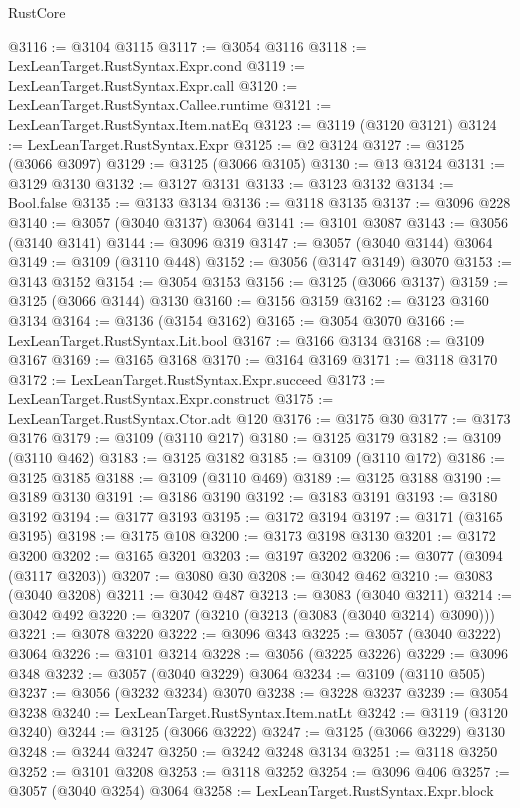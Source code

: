 \begin{lexlean}{RustCore}
\begin{coremodule}
@3116 := @3104 @3115
@3117 := @3054 @3116
@3118 := LexLeanTarget.RustSyntax.Expr.cond
@3119 := LexLeanTarget.RustSyntax.Expr.call
@3120 := LexLeanTarget.RustSyntax.Callee.runtime
@3121 := LexLeanTarget.RustSyntax.Item.natEq
@3123 := @3119 (@3120 @3121)
@3124 := LexLeanTarget.RustSyntax.Expr
@3125 := @2 @3124
@3127 := @3125 (@3066 @3097)
@3129 := @3125 (@3066 @3105)
@3130 := @13 @3124
@3131 := @3129 @3130
@3132 := @3127 @3131
@3133 := @3123 @3132
@3134 := Bool.false
@3135 := @3133 @3134
@3136 := @3118 @3135
@3137 := @3096 @228
@3140 := @3057 (@3040 @3137) @3064
@3141 := @3101 @3087
@3143 := @3056 (@3140 @3141)
@3144 := @3096 @319
@3147 := @3057 (@3040 @3144) @3064
@3149 := @3109 (@3110 @448)
@3152 := @3056 (@3147 @3149) @3070
@3153 := @3143 @3152
@3154 := @3054 @3153
@3156 := @3125 (@3066 @3137)
@3159 := @3125 (@3066 @3144) @3130
@3160 := @3156 @3159
@3162 := @3123 @3160 @3134
@3164 := @3136 (@3154 @3162)
@3165 := @3054 @3070
@3166 := LexLeanTarget.RustSyntax.Lit.bool
@3167 := @3166 @3134
@3168 := @3109 @3167
@3169 := @3165 @3168
@3170 := @3164 @3169
@3171 := @3118 @3170
@3172 := LexLeanTarget.RustSyntax.Expr.succeed
@3173 := LexLeanTarget.RustSyntax.Expr.construct
@3175 := LexLeanTarget.RustSyntax.Ctor.adt @120
@3176 := @3175 @30
@3177 := @3173 @3176
@3179 := @3109 (@3110 @217)
@3180 := @3125 @3179
@3182 := @3109 (@3110 @462)
@3183 := @3125 @3182
@3185 := @3109 (@3110 @172)
@3186 := @3125 @3185
@3188 := @3109 (@3110 @469)
@3189 := @3125 @3188
@3190 := @3189 @3130
@3191 := @3186 @3190
@3192 := @3183 @3191
@3193 := @3180 @3192
@3194 := @3177 @3193
@3195 := @3172 @3194
@3197 := @3171 (@3165 @3195)
@3198 := @3175 @108
@3200 := @3173 @3198 @3130
@3201 := @3172 @3200
@3202 := @3165 @3201
@3203 := @3197 @3202
@3206 := @3077 (@3094 (@3117 @3203))
@3207 := @3080 @30
@3208 := @3042 @462
@3210 := @3083 (@3040 @3208)
@3211 := @3042 @487
@3213 := @3083 (@3040 @3211)
@3214 := @3042 @492
@3220 := @3207 (@3210 (@3213 (@3083 (@3040 @3214) @3090)))
@3221 := @3078 @3220
@3222 := @3096 @343
@3225 := @3057 (@3040 @3222) @3064
@3226 := @3101 @3214
@3228 := @3056 (@3225 @3226)
@3229 := @3096 @348
@3232 := @3057 (@3040 @3229) @3064
@3234 := @3109 (@3110 @505)
@3237 := @3056 (@3232 @3234) @3070
@3238 := @3228 @3237
@3239 := @3054 @3238
@3240 := LexLeanTarget.RustSyntax.Item.natLt
@3242 := @3119 (@3120 @3240)
@3244 := @3125 (@3066 @3222)
@3247 := @3125 (@3066 @3229) @3130
@3248 := @3244 @3247
@3250 := @3242 @3248 @3134
@3251 := @3118 @3250
@3252 := @3101 @3208
@3253 := @3118 @3252
@3254 := @3096 @406
@3257 := @3057 (@3040 @3254) @3064
@3258 := LexLeanTarget.RustSyntax.Expr.block

\end{coremodule}
\end{lexlean}
